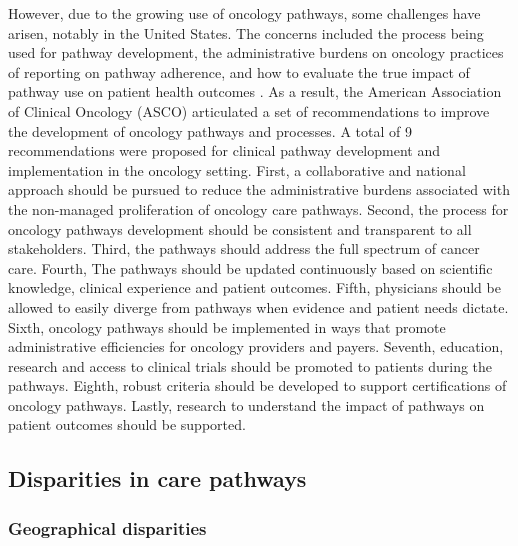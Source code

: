 However, due to the growing use of oncology pathways, some challenges
have arisen, notably in the United States. The concerns included the
process being used for pathway development, the administrative burdens on
oncology practices of reporting on pathway adherence, and how to evaluate the
true impact of pathway use on patient health outcomes \cite{zon_american_2016}.
As a result, the American Association of Clinical Oncology (ASCO) articulated
a set of recommendations to improve the development of oncology pathways and
processes. A total of 9 recommendations were proposed for clinical pathway
development and implementation in the oncology setting.
First, a collaborative and national approach should be pursued to reduce
the administrative burdens associated with the non-managed proliferation of
oncology care pathways. Second, the process for oncology pathways development
should be consistent and transparent to all stakeholders. Third, the pathways
should address the full spectrum of cancer care. Fourth, The pathways should
be updated continuously based on scientific knowledge, clinical experience
and patient outcomes. Fifth, physicians should be allowed to easily diverge
from pathways when evidence and patient needs dictate. Sixth, oncology pathways
should be implemented in ways that promote administrative efficiencies for
oncology providers and payers. Seventh, education, research and access to
clinical trials should be promoted to patients during the pathways. Eighth,
robust criteria should be developed to support certifications of oncology
pathways. Lastly, research to understand the impact of pathways on patient
outcomes should be supported.

\subsection{Disparities in care pathways}

\subsubsection{Geographical disparities}


